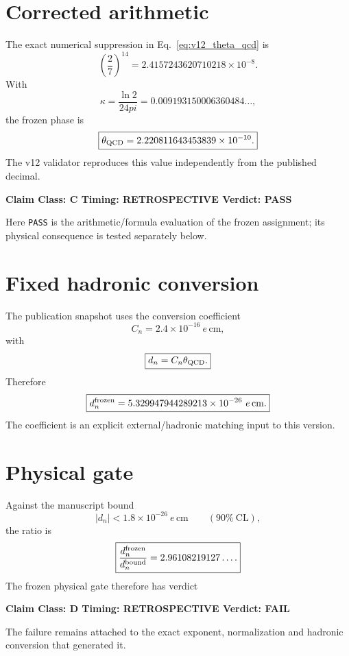\documentclass[11pt,a4paper,twoside]{book}
\def\pi{pi}%
\theoremstyle{definition}
\newcommand{\vTwelveStatus}[3]{\par\noindent\textbf{Claim Class: #1 \quad Timing: #2 \quad Verdict: #3}\par}
\begin{document}
\section{Corrected arithmetic}

The exact numerical suppression in Eq.~\eqref{eq:v12_theta_qcd} is
\begin{equation}
\left(\frac27\right)^{14}
=2.4157243620710218\times10^{-8}.
\end{equation}
With
\[
\kappa=\frac{\ln2}{24\pi}=0.009193150006360484\ldots,
\]
the frozen phase is
\begin{equation}
\boxed{
\theta_{\rm QCD}
=2.220811643453839\times10^{-10}.
}
\label{eq:v12_theta_qcd_numeric}
\end{equation}
The v12 validator reproduces this value independently from the published decimal.
\vTwelveStatus{C}{RETROSPECTIVE}{PASS}
Here \texttt{PASS} is the arithmetic/formula evaluation of the frozen assignment; its physical consequence is tested separately below.

\section{Fixed hadronic conversion}

The publication snapshot uses the conversion coefficient
\begin{equation}
C_n=2.4\times10^{-16}\ e\,\mathrm{cm},
\end{equation}
with
\begin{equation}
\boxed{
d_n=C_n\theta_{\rm QCD}.
}
\label{eq:v12_nedm_map}
\end{equation}
Therefore
\begin{equation}
\boxed{
d_n^{\rm frozen}
=5.329947944289213\times10^{-26}\ e\,\mathrm{cm}.
}
\label{eq:v12_nedm_value}
\end{equation}
The coefficient is an explicit external/hadronic matching input to this version.

\section{Physical gate}

Against the manuscript bound
\begin{equation}
|d_n|<1.8\times10^{-26}\ e\,\mathrm{cm}
\qquad(90\%\ \mathrm{CL}),
\label{eq:v12_nedm_bound}
\end{equation}
the ratio is
\begin{equation}
\boxed{
\frac{d_n^{\rm frozen}}{d_n^{\rm bound}}
=2.96108219127\ldots .
}
\end{equation}
The frozen physical gate therefore has verdict
\vTwelveStatus{D}{RETROSPECTIVE}{FAIL}
The failure remains attached to the exact exponent, normalization and hadronic conversion that generated it.
\end{document}

